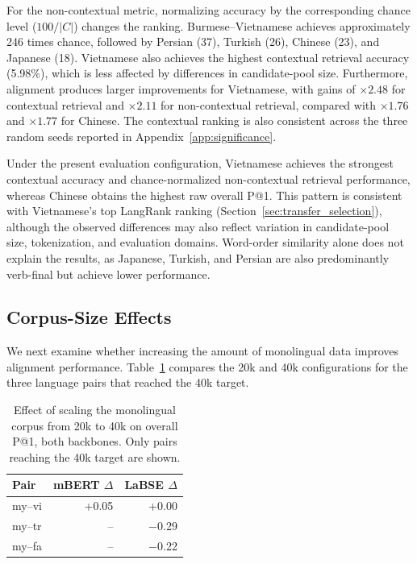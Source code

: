 \documentclass[11pt]{article}
\begin{document}
For the non-contextual metric, normalizing accuracy by the corresponding chance level ($100/|C|$) changes the ranking. Burmese--Vietnamese achieves approximately 246 times chance, followed by Persian (37), Turkish (26), Chinese (23), and Japanese (18). Vietnamese also achieves the highest contextual retrieval accuracy (5.98\%), which is less affected by differences in candidate-pool size. Furthermore, alignment produces larger improvements for Vietnamese, with gains of $\times2.48$ for contextual retrieval and $\times2.11$ for non-contextual retrieval, compared with $\times1.76$ and $\times1.77$ for Chinese. The contextual ranking is also consistent across the three random seeds reported in Appendix~\ref{app:significance}.

Under the present evaluation configuration, Vietnamese achieves the strongest contextual accuracy and chance-normalized non-contextual retrieval performance, whereas Chinese obtains the highest raw overall P@1. This pattern is consistent with Vietnamese's top LangRank ranking (Section~\ref{sec:transfer_selection}), although the observed differences may also reflect variation in candidate-pool size, tokenization, and evaluation domains. Word-order similarity alone does not explain the results, as Japanese, Turkish, and Persian are also predominantly verb-final but achieve lower performance.

\subsection{Corpus-Size Effects}
\label{sec:corpus_size}

We next examine whether increasing the amount of monolingual data improves alignment performance. Table~\ref{tab:corpus_size_combined} compares the 20k and 40k configurations
for the three language pairs that reached the 40k target.

\begin{table}[h]
\centering
\small
\setlength{\tabcolsep}{4pt}
\caption{Effect of scaling the monolingual corpus from 20k to 40k on overall P@1, both backbones. Only pairs reaching the 40k target are shown.}
\label{tab:corpus_size_combined}
\begin{tabular}{lrr}
\toprule
\textbf{Pair} & \textbf{mBERT $\Delta$} & \textbf{LaBSE $\Delta$} \\
\midrule
my--vi & +0.05 & +0.00 \\
my--tr & -- & $-$0.29 \\
my--fa & -- & $-$0.22 \\
\bottomrule
\end{tabular}
\end{table}
\end{document}
